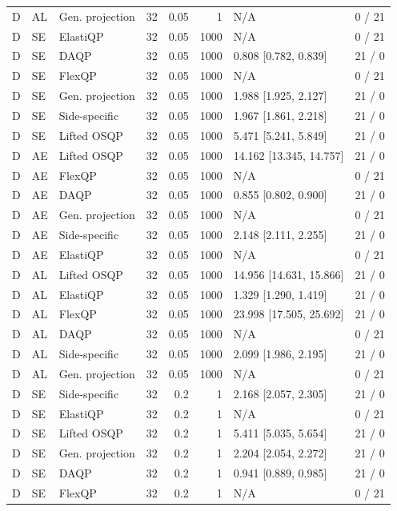 \begin{longtable}{@{}lllrrrlr@{}}
D & AL & Gen. projection & 32 & 0.05 & 1 & N/A & 0 / 21 \\
D & SE & ElastiQP & 32 & 0.05 & 1000 & N/A & 0 / 21 \\
D & SE & DAQP & 32 & 0.05 & 1000 & 0.808 [0.782, 0.839] & 21 / 0 \\
D & SE & FlexQP & 32 & 0.05 & 1000 & N/A & 0 / 21 \\
D & SE & Gen. projection & 32 & 0.05 & 1000 & 1.988 [1.925, 2.127] & 21 / 0 \\
D & SE & Side-specific & 32 & 0.05 & 1000 & 1.967 [1.861, 2.218] & 21 / 0 \\
D & SE & Lifted OSQP & 32 & 0.05 & 1000 & 5.471 [5.241, 5.849] & 21 / 0 \\
D & AE & Lifted OSQP & 32 & 0.05 & 1000 & 14.162 [13.345, 14.757] & 21 / 0 \\
D & AE & FlexQP & 32 & 0.05 & 1000 & N/A & 0 / 21 \\
D & AE & DAQP & 32 & 0.05 & 1000 & 0.855 [0.802, 0.900] & 21 / 0 \\
D & AE & Gen. projection & 32 & 0.05 & 1000 & N/A & 0 / 21 \\
D & AE & Side-specific & 32 & 0.05 & 1000 & 2.148 [2.111, 2.255] & 21 / 0 \\
D & AE & ElastiQP & 32 & 0.05 & 1000 & N/A & 0 / 21 \\
D & AL & Lifted OSQP & 32 & 0.05 & 1000 & 14.956 [14.631, 15.866] & 21 / 0 \\
D & AL & ElastiQP & 32 & 0.05 & 1000 & 1.329 [1.290, 1.419] & 21 / 0 \\
D & AL & FlexQP & 32 & 0.05 & 1000 & 23.998 [17.505, 25.692] & 21 / 0 \\
D & AL & DAQP & 32 & 0.05 & 1000 & N/A & 0 / 21 \\
D & AL & Side-specific & 32 & 0.05 & 1000 & 2.099 [1.986, 2.195] & 21 / 0 \\
D & AL & Gen. projection & 32 & 0.05 & 1000 & N/A & 0 / 21 \\
D & SE & Side-specific & 32 & 0.2 & 1 & 2.168 [2.057, 2.305] & 21 / 0 \\
D & SE & ElastiQP & 32 & 0.2 & 1 & N/A & 0 / 21 \\
D & SE & Lifted OSQP & 32 & 0.2 & 1 & 5.411 [5.035, 5.654] & 21 / 0 \\
D & SE & Gen. projection & 32 & 0.2 & 1 & 2.204 [2.054, 2.272] & 21 / 0 \\
D & SE & DAQP & 32 & 0.2 & 1 & 0.941 [0.889, 0.985] & 21 / 0 \\
D & SE & FlexQP & 32 & 0.2 & 1 & N/A & 0 / 21 \\

\end{longtable}
